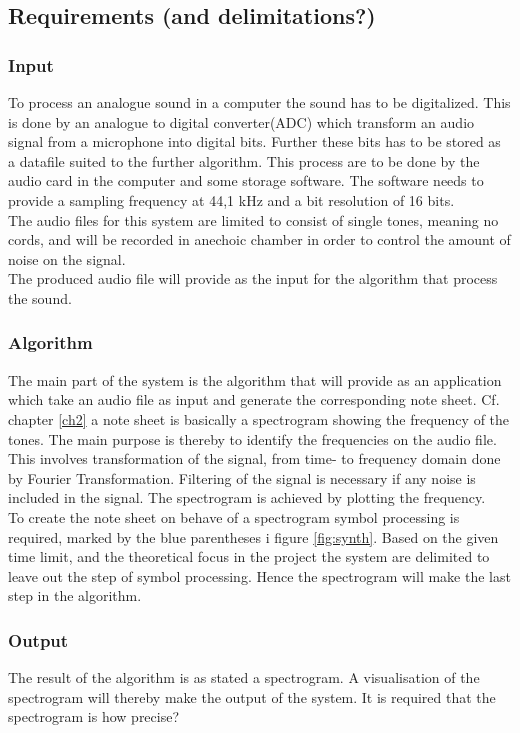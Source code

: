         
\subsection{Requirements (and delimitations?)}
\subsubsection{Input}
To process an analogue sound in a computer the sound has to be digitalized. This is done by an analogue to digital converter(ADC) which transform an audio signal from a microphone into digital bits. Further these bits has to be stored as a datafile suited to the further algorithm. This process are to be done by the audio card in the  computer and some storage software. The software needs to provide a sampling frequency at 44,1 kHz and a bit resolution of 16 bits.\cite{Mic} \\
The audio files for this system are limited to consist of single tones, meaning no cords, and will be recorded in anechoic chamber in order to control the amount of noise on the signal.\\      
The produced audio file will provide as the input for the algorithm that process the sound. 

\subsubsection{Algorithm}
The main part of the system is the algorithm that will provide as an application which take an audio file as input and generate the corresponding note sheet. Cf. chapter \ref{ch2} a note sheet is basically a spectrogram showing the frequency of the tones. The main purpose is thereby to identify the frequencies on the audio file. This involves transformation of the signal, from time- to frequency domain done by Fourier Transformation. Filtering of the signal is necessary if any noise is included in the signal. The spectrogram is achieved by plotting the frequency. \\
To create the note sheet on behave of a spectrogram symbol processing is required, marked by the blue parentheses i figure \ref{fig:synth}. Based on the given time limit, and the theoretical focus in the project the system are delimited to leave out the step of symbol processing. Hence the spectrogram will make the last step in the algorithm. 

\subsubsection{Output} 
The result of the algorithm is as stated a spectrogram. A visualisation of the spectrogram will thereby make the output of the system. It is required that the spectrogram is how precise?       

